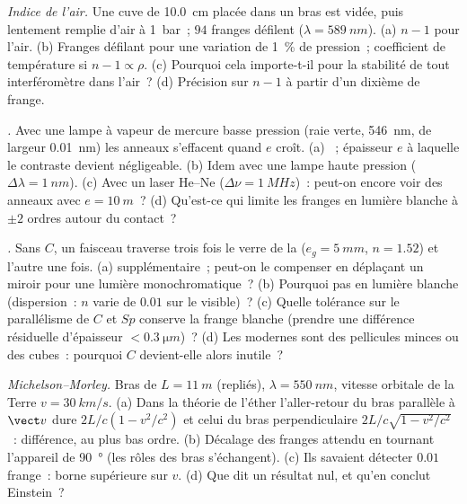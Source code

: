 \begin{exercise}[$\star\star$]\label{exo:b2:michelson:6}
\emph{Indice de l'air.} Une cuve de \qty{10.0}{cm} placée dans un bras est vidée, puis
lentement remplie d'air à \qty{1}{bar}~; $94$ franges défilent ($\lambda = \qty{589}{nm}$).
(a) $n - 1$ pour l'air. (b) Franges défilant pour une variation de \qty{1}{\%} de
pression~; coefficient de température si $n - 1 \propto \rho$. (c) Pourquoi cela
importe-t-il pour la stabilité de tout interféromètre dans l'air~? (d) Précision sur
$n - 1$ à partir d'un dixième de frange.
\end{exercise}

\begin{exercise}[$\star\star$]\label{exo:b2:michelson:7}
\emph{.} Avec une lampe à vapeur de mercure basse pression (raie verte,
\qty{546}{nm}, de largeur \qty{0.01}{nm}) les anneaux s'effacent quand $e$ croît. (a) ~; épaisseur $e$ à laquelle le contraste devient négligeable. (b) Idem
avec une lampe haute pression ($\Delta\lambda = \qty{1}{nm}$). (c) Avec un laser He--Ne
($\Delta\nu = \qty{1}{MHz}$)~: peut-on encore voir des anneaux avec $e = \qty{10}{m}$~? (d) Qu'est-ce qui
limite les franges en lumière blanche à $\pm2$ ordres autour du contact~?
\end{exercise}

\begin{exercise}[$\star\star$]\label{exo:b2:michelson:8}
\emph{.} Sans $C$, un faisceau traverse trois fois le verre de la
 ($e_g = \qty{5}{mm}$, $n = 1.52$) et l'autre une fois. (a)
 supplémentaire~; peut-on le compenser en déplaçant un miroir pour une
lumière monochromatique~? (b) Pourquoi pas en lumière blanche (dispersion~: $n$
varie de $0.01$ sur le visible)~? (c) Quelle tolérance sur le
parallélisme de $C$ et $Sp$ conserve la frange blanche (prendre une différence
résiduelle d'épaisseur $< \qty{0.3}{\micro m}$)~? (d) Les  modernes sont des
pellicules minces ou des cubes~: pourquoi $C$ devient-elle alors inutile~?
\end{exercise}

\begin{exercise}[$\star\star$]\label{exo:b2:michelson:9}
\emph{Michelson--Morley.} Bras de $L = \qty{11}{m}$ (repliés), $\lambda = \qty{550}{nm}$,
vitesse orbitale de la Terre $v = \qty{30}{km/s}$. (a) Dans la théorie de l'éther
l'aller-retour du bras parallèle à $\vect v$ dure $2L/c(1 - v^2/c^2)$
et celui du bras perpendiculaire $2L/c\sqrt{1 - v^2/c^2}$~: différence, au plus bas
ordre. (b) Décalage des franges attendu en tournant l'appareil de \qty{90}{\degree}
(les rôles des bras s'échangent). (c) Ils savaient détecter $0.01$ frange~: borne
supérieure sur $v$. (d) Que dit un résultat nul, et qu'en conclut Einstein~?
\end{exercise}

